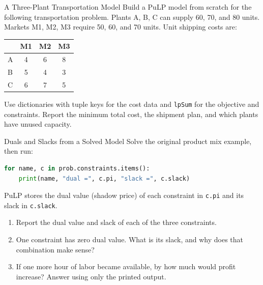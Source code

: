 \begin{ex}{A Three-Plant Transportation Model}{}
\label{ex:pulp-transport-model}
Build a PuLP model from scratch for the following transportation problem. Plants A, B, C can supply 60, 70, and 80 units. Markets M1, M2, M3 require 50, 60, and 70 units. Unit shipping costs are:

\begin{center}
\begin{tabular}{l|ccc}
 & M1 & M2 & M3 \\
\hline
A & 4 & 6 & 8 \\
B & 5 & 4 & 3 \\
C & 6 & 7 & 5 \\
\end{tabular}
\par{}\label{tab:software-python-book1-tab02}%

\end{center}

Use dictionaries with tuple keys for the cost data and \texttt{lpSum} for the objective and constraints. Report the minimum total cost, the shipment plan, and which plants have unused capacity.
\end{ex}

\begin{ex}{Duals and Slacks from a Solved Model}{}
\label{ex:pulp-duals}
Solve the original product mix example, then run:
\begin{lstlisting}[language=Python]
for name, c in prob.constraints.items():
    print(name, "dual =", c.pi, "slack =", c.slack)
\end{lstlisting}
PuLP stores the dual value (shadow price) of each constraint in \texttt{c.pi} and its slack in \texttt{c.slack}.
\begin{enumerate}
\item Report the dual value and slack of each of the three constraints.
\item One constraint has zero dual value. What is its slack, and why does that combination make sense?
\item If one more hour of labor became available, by how much would profit increase? Answer using only the printed output.
\end{enumerate}
\end{ex}

